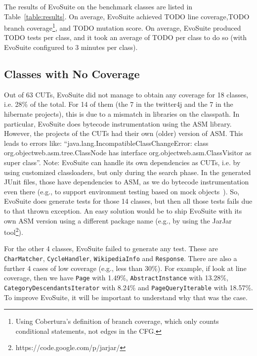 \documentclass[10pt,conference,compsocconf]{IEEEtran}
\newcommand{\codeid}[1]{\texttt{#1}}
\def\<#1>{\codeid{#1}}
\newcommand{\EVOSUITE}{{\sc EvoSuite}\xspace}
\begin{document}

The results of \EVOSUITE on the benchmark classes are listed in
Table~\ref{table:results}. On average, \EVOSUITE achieved TODO line
coverage,TODO branch coverage\footnote{Using Cobertura's definition
  of branch coverage, which only counts conditional statements, not
  edges in the CFG.}, and TODO mutation score. On average, \EVOSUITE
produced TODO tests per class, and it took an average of TODO per class to
do so (with \EVOSUITE configured to 3 minutes per class).



\subsection{Classes with No Coverage}

Out of 63 CUTs, \EVOSUITE did not manage to obtain any coverage for 18 classes, i.e. 28\% 
of the total.
For 14 of them (the 7 in the twitter4j and the 7 in the hibernate projects), this is due
to a mismatch in libraries on the classpath. 
In particular, \EVOSUITE does bytecode instrumentation using the ASM library.
However, the projects of the CUTs had their own (older) version of ASM.
This leads to errors like: ``java.lang.IncompatibleClassChangeError: 
class org.objectweb.asm.tree.ClassNode has interface org.objectweb.asm.ClassVisitor as super class''.
Note: \EVOSUITE can handle its own dependencies as CUTs, i.e. by using customized classloaders, 
but only during the search phase.
In the generated JUnit files, those have dependencies to ASM, as we do bytecode instrumentation
even there (e.g., to support environment testing based on mock objects~\cite{arcuri2014automated}).
So, \EVOSUITE does generate tests for those 14 classes, but then all those tests fails due to
that thrown exception.
An easy solution would be to ship \EVOSUITE with its own ASM version using a 
different package name (e.g., by using the JarJar tool\footnote{https://code.google.com/p/jarjar/}).

For the other 4 classes, \EVOSUITE failed to generate any test. These are
\<CharMatcher>, \<CycleHandler>, \<WikipediaInfo> and \<Response>.
There are also a further 4 cases of low coverage (e.g., less than 30\%).
For example, if look at line coverage, then 
we have \<Page> with 1.49\%, \<AbstractInstance> with 13.28\%, \<CategoryDescendantsIterator> with 8.24\%
and \<PageQueryIterable> with 18.57\%.
To improve \EVOSUITE, it will be important to understand why that was the case. 
\end{document}
